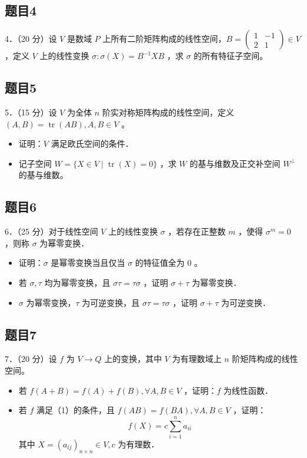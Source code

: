\documentclass{article}
\begin{document}
\subsection{题目4}
4．（20 分）设 \(V\) 是数域 \(P\) 上所有二阶矩阵构成的线性空间，\(B=\left(\begin{array}{cc}1 & -1 \\ 2 & 1\end{array}\right) \in V\) ，定义 \(V\) 上的线性变换 \(\sigma: \sigma(X)=B^{-1} X B\) ，求 \(\sigma\) 的所有特征子空间。

\subsection{题目5}
5．（15 分）设 \(V\) 为全体 \(n\) 阶实对称矩阵构成的线性空间，定义 \((A, B)=\operatorname{tr}(A B), A, B \in V\) 。

\begin{itemize}
  \item[（1）] 证明：\(V\) 满足欧氏空间的条件．
  \item[（2）] 记子空间 \(W=\{X \in V \mid \operatorname{tr}(X)=0\}\) ，求 \(W\) 的基与维数及正交补空间 \(W^{\perp}\) 的基与维数。
\end{itemize}

\subsection{题目6}
6．（25 分）对于线性空间 \(V\) 上的线性变换 \(\sigma\) ，若存在正整数 \(m\) ，使得 \(\sigma^{m}=0\) ，则称 \(\sigma\) 为幂零变换．

\begin{itemize}
  \item[（1）] 证明：\(\sigma\) 是幂零变换当且仅当 \(\sigma\) 的特征值全为 0 。
  \item[（2）] 若 \(\sigma, \tau\) 均为幂零变换，且 \(\sigma \tau=\tau \sigma\) ，证明 \(\sigma+\tau\) 为幂零变换．
  \item[（3）] \(\sigma\) 为幂零变换，\(\tau\) 为可逆变换，且 \(\sigma \tau=\tau \sigma\) ，证明 \(\sigma+\tau\) 为可逆变换．
\end{itemize}

\subsection{题目7}
7．（20 分）设 \(f\) 为 \(V \rightarrow Q\) 上的变换，其中 \(V\) 为有理数域上 \(n\) 阶矩阵构成的线性空间。

\begin{itemize}
  \item[（1）] 若 \(f(A+B)=f(A)+f(B), \forall A, B \in V\) ，证明：\(f\) 为线性函数．
  \item[（2）] 若 \(f\) 满足（1）的条件，且 \(f(A B)=f(B A), \forall A, B \in V\) ，证明：
\[
f(X)=c \sum_{i=1}^{n} a_{i i}
\]
其中 \(X=\left(a_{i j}\right)_{n \times n} \in V, c\) 为有理数．
\end{itemize}
\end{document}
